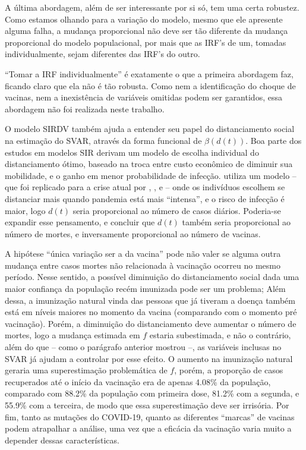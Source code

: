 \documentclass[
	12pt,				%
	oneside,			%
	a4paper,			%
	english,			%
	brazil				%
	hyperref = {colorlinks, citecolor=c1d, linkcolor=c2d, urlcolor=c3d, colorlinks}
	]{abntex2}
\newcounter{j}
\begin{document}
A última abordagem, além de ser interessante por si só, tem uma certa robustez. Como estamos olhando para a variação do modelo, mesmo que ele apresente alguma falha, a mudança proporcional não deve ser tão diferente da mudança proporcional do modelo populacional, por mais que as IRF's de um, tomadas individualmente, sejam diferentes das IRF's do outro.

``Tomar a IRF individualmente'' é exatamente o que a primeira abordagem faz, ficando claro que ela não é tão robusta. Como nem a identificação do choque de vacinas, nem a inexistência de variáveis omitidas podem ser garantidos, essa abordagem não foi realizada neste trabalho.

O modelo SIRDV também ajuda a entender seu papel do distanciamento social na estimação do SVAR, através da forma funcional de $\beta(d(t))$. Boa parte dos estudos em modelos SIR derivam um modelo de escolha individual do distanciamento ótimo, baseado na troca entre custo econômico de diminuir sua mobilidade, e o ganho em menor probabilidade de infecção. \textcite{Reluga2010} utiliza um modelo -- que foi replicado para a crise atual por \textcite{Cabrera2021}, \textcite{Mwalili2020}, e \textcite{Baker2020} -- onde os indivíduos escolhem se distanciar mais quando pandemia está mais ``intensa'', e o risco de infecção é maior, logo $d(t)$ seria proporcional ao número de casos diários. Poderia-se expandir esse pensamento, e concluir que $d(t)$ também seria proporcional ao número de mortes, e inversamente proporcional ao número de vacinas.

A hipótese ``única variação ser a da vacina'' pode não valer se alguma outra mudança entre casos mortes não relacionada à vacinação ocorreu no mesmo período. Nesse sentido, a possível diminuição do distanciamento social dada uma maior confiança da população recém imunizada pode ser um problema; Além dessa, a imunização natural vinda das pessoas que já tiveram a doença também está em níveis maiores no momento da vacina (comparando com o momento pré vacinação). Porém, a diminuição do distanciamento deve aumentar o número de mortes, logo a mudança estimada em $f$ estaria subestimada, e não o contrário, além do que -- como o parágrafo anterior mostrou --, as variáveis inclusas no SVAR já ajudam a controlar por esse efeito. O aumento na imunização natural geraria uma superestimação problemática de $f$, porém, a proporção de casos recuperados até o início da vacinação era de apenas 4.08\% da população, comparado com 88.2\% da população com primeira dose, 81.2\% com a segunda, e 55.9\% com a terceira, de modo que essa superestimação deve ser irrisória. Por fim, tanto as mutações do COVID-19, quanto as diferentes ``marcas'' de vacinas podem atrapalhar a análise, uma vez que a eficácia da vacinação varia muito a depender dessas características.
\end{document}

